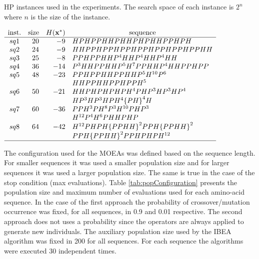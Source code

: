 \begin{table}[]
	\begin{center}
		\caption{HP instances used in the experiments. The search space of each instance is $2^n$ where $n$ is the size of
			the instance.}
		\label{tab:instances}
		{$\begin{array}{c r r l}
			\text{inst.} & \text{size} &  \multicolumn{1}{ c }{H({\bf{x}}^*)} & \multicolumn{1}{c}{\text{sequence}} \\ \hline
			sq1 &20 &-9 & HPHPPHHPHHPHPHHPPHPH \\
			sq2 &24 &-9 & HHPPHPPHPPHPPHPPHPPHPPHH \\
			sq3 &25 &-8 & PPHPPHHP^4HHP^4HHP^4HH \\
			sq4 &36 &-14 &  P^3HHPPHHP^5H^7PPHHP^4HHPPHPP\\
			sq5 &48 &-23 &  PPHPPHHPPHHP^5H^{10}P^6 \\
			&   &    &  HHPPHHPPHPPH^5 \\
			sq6 &50 &-21 &  HHPHPHPHPH^4PHP^3HP^3HP^4 \\
			&   &    & HP^3HP^3HPH^4{\{PH\}}^4H\\
			sq7 &60 &-36 &  PPH^3PH^8P^3H^{10}PHP^3\\
			&   &    &  H^{12}P^4H^6PHHPHP\\
			sq8 &64 &-42 &   H^{12}PHPH{\{PPHH\}}^2PPH{\{PPHH\}}^2\\
			&   &    &  PPH{\{PPHH\}}^2PPHPHPH^{12}\\
			\hline
			\end{array}$}
	\end{center}
\end{table}

The configuration used for the MOEAs was defined based on the sequence length. For smaller sequences it was used a smaller population size and for larger sequences it was used a larger population size. The same is true in the case of the stop condition (max evaluations). Table \ref{tab:popConfiguration} presents the population size and maximum number of evaluations used for each amino-acid sequence. In the case of the first approach the probability of crossover/mutation occurrence was fixed, for all sequences, in 0.9 and 0.01 respective. The second approach does not uses a probability since the operators are always applied to generate new individuals. The auxiliary population size used by the IBEA algorithm was fixed in 200 for all sequences. For each sequence the algorithms were executed 30 independent times.


